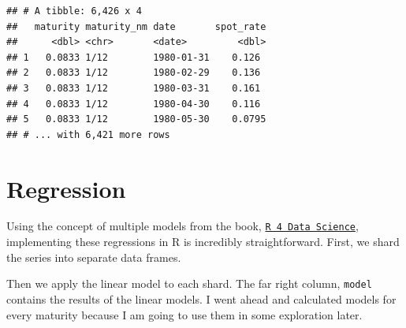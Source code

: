 \documentclass[]{book}
\newenvironment{Shaded}{\begin{snugshade}}{\end{snugshade}}
\newcommand{\CommentTok}[1]{\textcolor[rgb]{0.56,0.35,0.01}{\textit{#1}}}
\newcommand{\DataTypeTok}[1]{\textcolor[rgb]{0.13,0.29,0.53}{#1}}
\newcommand{\KeywordTok}[1]{\textcolor[rgb]{0.13,0.29,0.53}{\textbf{#1}}}
\newcommand{\NormalTok}[1]{#1}
\newcommand{\OperatorTok}[1]{\textcolor[rgb]{0.81,0.36,0.00}{\textbf{#1}}}
\newcommand{\StringTok}[1]{\textcolor[rgb]{0.31,0.60,0.02}{#1}}
\theoremstyle{definition}
\theoremstyle{definition}
\theoremstyle{definition}
\theoremstyle{remark}
\begin{document}
\begin{verbatim}
## # A tibble: 6,426 x 4
##   maturity maturity_nm date       spot_rate
##      <dbl> <chr>       <date>         <dbl>
## 1   0.0833 1/12        1980-01-31    0.126 
## 2   0.0833 1/12        1980-02-29    0.136 
## 3   0.0833 1/12        1980-03-31    0.161 
## 4   0.0833 1/12        1980-04-30    0.116 
## 5   0.0833 1/12        1980-05-30    0.0795
## # ... with 6,421 more rows
\end{verbatim}

\hypertarget{regression}{%
\section{Regression}\label{regression}}

Using the concept of multiple models from the book,
\href{http://r4ds.had.co.nz/many-models.html}{\texttt{R\ 4\ Data\ Science}},
implementing these regressions in R is incredibly straightforward.
First, we shard the series into separate data frames.

\begin{Shaded}
\end{Shaded}

Then we apply the linear model to each shard. The far right column,
\texttt{model} contains the results of the linear models. I went ahead
and calculated models for every maturity because I am going to use them
in some exploration later.

\begin{Shaded}
\end{Shaded}
\end{document}
